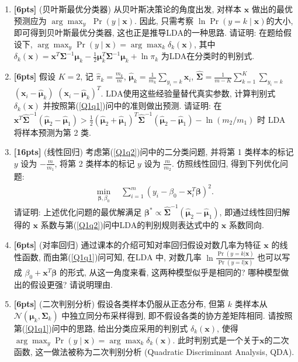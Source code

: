 \documentclass[a4paper,UTF8]{article}
\theoremstyle{definition}
\begin{document}
\begin{enumerate}[(1)]
	\item \textbf{[6pts]} (贝叶斯最优分类器) \label{Q1q1}从贝叶斯决策论的角度出发, 对样本 $\bm{x}$ 做出的最优预测应为 $\arg\max_y$ $\Pr\left(y\mid \bm{x}\right)$. 因此, 只需考察 $\ln\Pr(y=k\mid \bm{x})$的大小, 即可得到贝叶斯最优分类器, 这也正是推导LDA的一种思路. 请证明: 在题给假设下, $\arg\max_y \Pr\left(y\mid \bm{x}\right)=\arg\max_k \delta_k(\bm{x})$, 其中 $\delta_{k}(\bm{x})=\bm{x}^{T} \bm{\Sigma}^{-1} \bm{\mu}_{k}-\frac{1}{2} \bm{\mu}_{k}^{T} \bm{\Sigma}^{-1} \bm{\mu}_{k}+\ln \pi_{k}$ 为LDA在分类时的判别式.
	\item \textbf{[6pts]} \label{Q1q2} 假设 $K=2$, 记 $\hat{\pi}_{k}=\frac{m_k}{m}$, $\hat{\bm{\mu}}_{k}=\frac{1}{m_k}\sum_{y_{i}=k} \bm{x}_{i}$, $\hat{\bm{\Sigma}}=\frac{1}{m-K}\sum_{k=1}^{K} \sum_{y_{i}=k}$ $\left(\bm{x}_{i}-\hat{\bm{\mu}}_{k}\right)$ $\left(\bm{x}_{i}-\hat{\bm{\mu}}_{k}\right)^{T}$. LDA使用这些经验量替代真实参数, 计算判别式 $\delta_k(\bm{x})$ 并按照第(\ref{Q1q1})问中的准则做出预测. 请证明: 在 $\bm{x}^{T} \hat{\bm{\Sigma}}^{-1}\left(\hat{\bm{\mu}}_{2}-\hat{\bm{\mu}}_{1}\right)>\frac{1}{2}\left(\hat{\bm{\mu}}_{2}+\hat{\bm{\mu}}_{1}\right)^{T} \hat{\bm{\Sigma}}^{-1}\left(\hat{\bm{\mu}}_{2}-\hat{\bm{\mu}}_{1}\right)-\ln \left(m_{2} / m_{1}\right)$ 时 LDA 将样本预测为第 2 类.
	\item \textbf{[16pts]} (线性回归) 考虑第(\ref{Q1q2})问中的二分类问题, 并将第 1 类样本的标记 $y$ 设为 $-\frac{m}{m_1}$, 将第 2 类样本的标记 $y$ 设为 $\frac{m}{m_2}$. 仿照线性回归, 得到下列优化问题:
	      \begin{align}
		      \label{ols}
		      \min_{\bm{\beta},\beta_0} \quad \sum_{i=1}^m(y_i-\beta_0-\bm{x}_i^T\bm{\beta})^2.
	      \end{align}
	      请证明: 上述优化问题的最优解满足 $\bm{\beta}^*\propto \hat{\bm{\Sigma}}^{-1}\left(\hat{\bm{\mu}}_{2}-\hat{\bm{\mu}}_{1}\right)$, 即通过线性回归解得的 $\bm{x}$ 系数与第(\ref{Q1q2})问中LDA的判别规则表达式中的 $\bm{x}$ 系数同向.
	\item \textbf{[6pts]} (对率回归) 通过课本的介绍可知对率回归假设对数几率为特征 $\bm{x}$ 的线性函数, 而由第(\ref{Q1q1})问可知, 在LDA 中, 对数几率 $\ln\frac{\Pr(y=k|\bm{x})}{\Pr(y=l|\bm{x})}$ 也可以写成 $\beta_0+\bm{x}^T\bm{\beta}$ 的形式, 从这一角度来看, 这两种模型似乎是相同的? 哪种模型做出的假设更强? 请说明理由.
	\item \textbf{[6pts]} (二次判别分析) 假设各类样本仍服从正态分布, 但第 $k$ 类样本从 $\mathcal{N}(\bm{\mu}_k,\bm{\Sigma}_k)$ 中独立同分布采样得到, 即不假设各类的协方差矩阵相同. 请按照第(\ref{Q1q1})问中的思路, 给出分类应采用的判别式 $\delta_k(\bm{x})$, 使得 $\arg\max_y \Pr\left(y\mid \bm{x}\right)=\arg\max_k \delta_k(\bm{x})$. 此时判别式是一个关于$\bm{x}$的二次函数, 这一做法被称为二次判别分析 (Quadratic Discriminant Analysis, QDA).
\end{enumerate}
\end{document}
